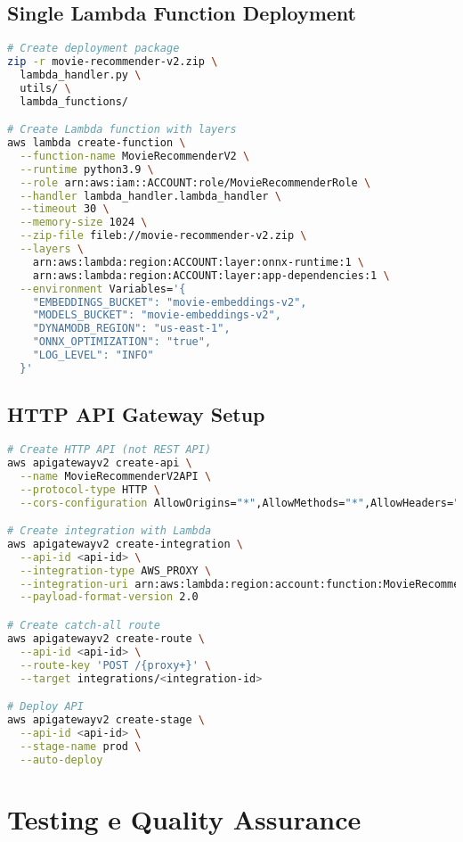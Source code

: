 \documentclass[11pt,a4paper]{article}
\begin{document}
\subsection{Single Lambda Function Deployment}
\begin{lstlisting}[language=bash, caption=Deployment Lambda Unificata]
# Create deployment package
zip -r movie-recommender-v2.zip \
  lambda_handler.py \
  utils/ \
  lambda_functions/

# Create Lambda function with layers
aws lambda create-function \
  --function-name MovieRecommenderV2 \
  --runtime python3.9 \
  --role arn:aws:iam::ACCOUNT:role/MovieRecommenderRole \
  --handler lambda_handler.lambda_handler \
  --timeout 30 \
  --memory-size 1024 \
  --zip-file fileb://movie-recommender-v2.zip \
  --layers \
    arn:aws:lambda:region:ACCOUNT:layer:onnx-runtime:1 \
    arn:aws:lambda:region:ACCOUNT:layer:app-dependencies:1 \
  --environment Variables='{
    "EMBEDDINGS_BUCKET": "movie-embeddings-v2",
    "MODELS_BUCKET": "movie-embeddings-v2", 
    "DYNAMODB_REGION": "us-east-1",
    "ONNX_OPTIMIZATION": "true",
    "LOG_LEVEL": "INFO"
  }'
\end{lstlisting}

\subsection{HTTP API Gateway Setup}
\begin{lstlisting}[language=bash, caption=HTTP API Gateway Configuration]
# Create HTTP API (not REST API)
aws apigatewayv2 create-api \
  --name MovieRecommenderV2API \
  --protocol-type HTTP \
  --cors-configuration AllowOrigins="*",AllowMethods="*",AllowHeaders="*"

# Create integration with Lambda
aws apigatewayv2 create-integration \
  --api-id <api-id> \
  --integration-type AWS_PROXY \
  --integration-uri arn:aws:lambda:region:account:function:MovieRecommenderV2 \
  --payload-format-version 2.0

# Create catch-all route
aws apigatewayv2 create-route \
  --api-id <api-id> \
  --route-key 'POST /{proxy+}' \
  --target integrations/<integration-id>

# Deploy API
aws apigatewayv2 create-stage \
  --api-id <api-id> \
  --stage-name prod \
  --auto-deploy
\end{lstlisting}

\section{Testing e Quality Assurance}
\end{document}
